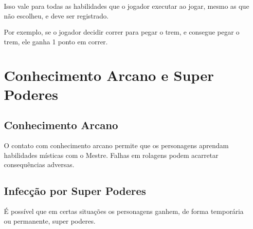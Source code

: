 \documentclass[a4paper,12pt]{book}
\begin{document}
Isso vale para todas as habilidades que o jogador executar ao jogar, mesmo as que não escolheu, e deve ser registrado.

Por exemplo, se o jogador decidir correr para pegar o trem, e consegue pegar o trem, ele ganha 1 ponto em correr.


\chapter{Conhecimento Arcano e Super Poderes}

\section{Conhecimento Arcano}

O contato com conhecimento arcano permite que os personagens aprendam habilidades místicas com o Mestre. Falhas em rolagens podem acarretar consequências adversas.

\section{Infecção por Super Poderes}

É possível que em certas situações os personagens ganhem, de forma temporária ou permanente, super poderes.
\end{document}

